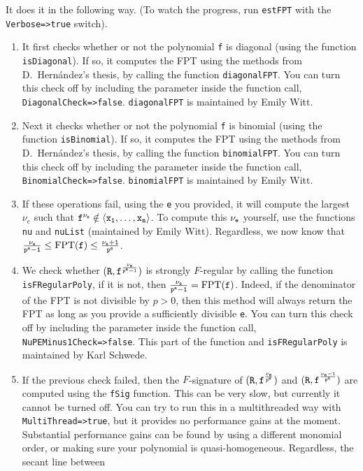 \documentclass[11pt,fullpage]{amsart}
\theoremstyle{definition}
\theoremstyle{remark}
\begin{document}
It does it in the following way.  (To watch the progress, run {\tt estFPT} with the {\tt Verbose=>true} switch).
\begin{enumerate}
\item It first checks whether or not the polynomial {\tt f} is diagonal (using the function {\tt isDiagonal}).  If so, it computes the FPT using the methods from D.~Hern\'andez's thesis, by calling the function {\tt diagonalFPT}.  You can turn this check off by including the parameter inside the function call, {\tt DiagonalCheck=>false}.  {\tt diagonalFPT} is maintained by Emily Witt.
\item Next it checks whether or not the polynomial {\tt f} is binomial (using the function {\tt isBinomial}).  If so, it computes the FPT using the methods from D.~Hern\'andez's thesis, by calling the function {\tt binomialFPT}.  You can turn this check off by including the parameter inside the function call, {\tt BinomialCheck=>false}.  {\tt binomialFPT} is maintained by Emily Witt.
\item If these operations fail, using the {\tt e} you provided, it will compute the largest $\nu_e$ such that ${\tt f^{\nu_e} \notin \langle x_1, \ldots, x_n \rangle}$.  To compute this ${\tt \nu_e}$ yourself, use the functions {\tt nu} and {\tt nuList} (maintained by Emily Witt).   Regardless, we now know that ${ \tt \nu_e \over p^e - 1}\leq \mathrm{FPT}({\tt f}) \leq { \tt \nu_e + 1 \over p^e}$.
\item We check whether ${\tt (R, f^{\nu_e \over p^e - 1})}$ is strongly $F$-regular by calling the function {\tt isFRegularPoly}, if it is not, then ${ \tt \nu_e \over p^e - 1} = \mathrm{FPT}({\tt f})$.  Indeed, if the denominator of the FPT is not divisible by $p > 0$, then this method will always return the FPT as long as you provide a sufficiently divisible {\tt e}.  You can turn this check off by including the parameter inside the function call, {\tt NuPEMinus1Check=>false}.  This part of the function and {\tt isFRegularPoly} is maintained by Karl Schwede.
\item If the previous check failed, then the $F$-signature of ${\tt (R, f^{\nu_e \over p^e})}$ and ${\tt (R, f^{\nu_e - 1 \over p^e})}$ are computed using the {\tt fSig} function.  This can be very slow, but currently it cannot be turned off.  You can try to run this in a multithreaded way with {\tt MultiThread=>true}, but it provides no performance gains at the moment.  Substantial performance gains can be found by using a different monomial order, or making sure your polynomial is quasi-homogeneous.  Regardless, the secant line between

\end{enumerate}
\end{document}
